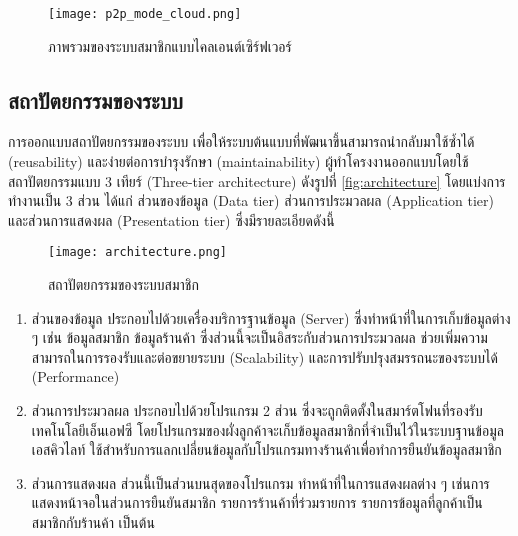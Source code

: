 \documentclass[12pt,a4paper]{article}
\begin{document}
\begin{figure}[ht!]
\centering
\texttt{[image: p2p\_mode\_cloud.png]}
\caption{ภาพรวมของระบบสมาชิกแบบไคลเอนต์เซิร์ฟเวอร์} \label{fig:p2p_mode_cloud}
\label{overflow}
\end{figure}

\subsection{สถาปัตยกรรมของระบบ}
การออกแบบสถาปัตยกรรมของระบบ เพื่อให้ระบบต้นแบบที่พัฒนาขึ้นสามารถนำกลับมาใช้ซ้ำได้ (reusability) และง่ายต่อการบำรุงรักษา (maintainability) ผู้ทำโครงงานออกแบบโดยใช้สถาปัตยกรรมแบบ 3 เทียร์ (Three-tier architecture) ดังรูปที่ \ref{fig:architecture} โดยแบ่งการทำงานเป็น 3 ส่วน ได้แก่ ส่วนของข้อมูล (Data tier) ส่วนการประมวลผล (Application tier) และส่วนการแสดงผล (Presentation tier) ซึ่งมีรายละเอียดดังนี้

\begin{figure}[ht!]
\centering
\texttt{[image: architecture.png]}
\caption{สถาปัตยกรรมของระบบสมาชิก} \label{fig:architecture}
\label{overflow}
\end{figure}

\begin{enumerate} 
\item ส่วนของข้อมูล ประกอบไปด้วยเครื่องบริการฐานข้อมูล (Server) ซึ่งทำหน้าที่ในการเก็บข้อมูลต่าง ๆ เช่น ข้อมูลสมาชิก ข้อมูลร้านค้า ซึ่งส่วนนี้จะเป็นอิสระกับส่วนการประมวลผล ช่วยเพิ่มความสามารถในการรองรับและต่อขยายระบบ (Scalability) และการปรับปรุงสมรรถนะของระบบได้ (Performance)

\item ส่วนการประมวลผล ประกอบไปด้วยโปรแกรม 2 ส่วน ซึ่งจะถูกติดตั้งในสมาร์ตโฟนที่รองรับเทคโนโลยีเอ็นเอฟซี โดยโปรแกรมของผั่งลูกค้าจะเก็บข้อมูลสมาชิกที่จำเป็นไว้ในระบบฐานข้อมูลเอสคิวไลท์ ใช้สำหรับการแลกเปลี่ยนข้อมูลกับโปรแกรมทางร้านค้าเพื่อทำการยืนยันข้อมูลสมาชิก

\item ส่วนการแสดงผล ส่วนนี้เป็นส่วนบนสุดของโปรแกรม ทำหน้าที่ในการแสดงผลต่าง ๆ เช่นการแสดงหน้าจอในส่วนการยืนยันสมาชิก รายการร้านค้าที่ร่วมรายการ รายการข้อมูลที่ลูกค้าเป็นสมาชิกกับร้านค้า เป็นต้น
\end{enumerate}
\end{document}
